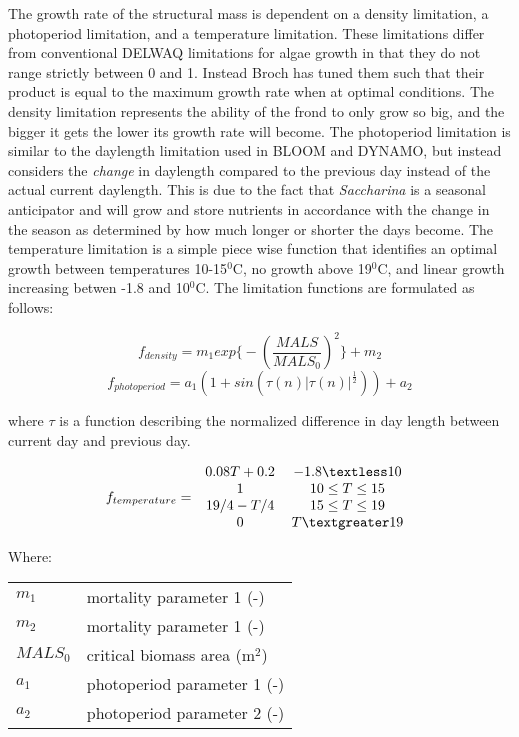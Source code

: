 \documentclass{deltares_manual}
\begin{document}
The growth rate of the structural mass is dependent on a density limitation, a photoperiod limitation, and a temperature limitation. These limitations differ from conventional DELWAQ limitations for algae growth in that they do not range strictly between 0 and 1. Instead Broch has tuned them such that their product is equal to the maximum growth rate when at optimal conditions. The density limitation represents the ability of the frond to only grow so big, and the bigger it gets the lower its growth rate will become. The photoperiod limitation is similar to the daylength limitation used in BLOOM and DYNAMO, but instead considers the \textit{change} in daylength compared to the previous day instead of the actual current daylength. This is due to the fact that \textit{Saccharina} is a seasonal anticipator and will grow and store nutrients in accordance with the change in the season as determined by how much longer or shorter the days become. The temperature limitation is a simple piece wise function that identifies an optimal growth between temperatures 10-15$^0$C, no growth above 19$^0$C, and linear growth increasing betwen -1.8 and 10$^0$C.  The limitation functions are formulated as follows:

\[f_{density} = m_1 exp\big\{-(\frac{MALS}{MALS_0})^2 \big\}+m_2\]
\[f_{photoperiod} = a_1 (1+sin(\tau (n) | \tau (n)| ^{\frac{1}{2}})) + a_2\]

where $\tau$ is a function describing the normalized difference in day length between current day and previous day.

\[f_{temperature} =  
\left 
.\begin{tabular}{cc}
$ 0.08T + 0.2 $    & $-1.8 \textless 10$ \\
$  1 $             & $10 \leq T \leq 15$ \\
$19/4 - T/4$       & $15 \leq T \leq 19$ \\ 
$0$                & $T \textgreater 19$ \\
\end{tabular}
\right 
.\]

Where:\\
\begin{tabular}{ll}
$m_1$    & mortality parameter 1 (-)\\
$m_2$    & mortality parameter 1 (-)\\
$MALS_0$ & critical biomass area (m$^2$)\\
$a_1$    & photoperiod parameter 1 (-)\\
$a_2$    & photoperiod parameter 2 (-)\\
\end{tabular}
\end{document}
